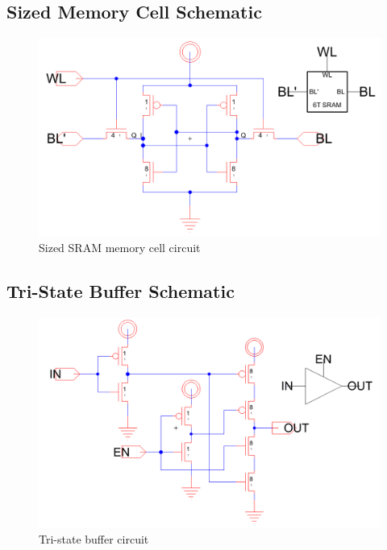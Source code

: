 \documentclass[12pt]{report}
\begin{document}
\subsection*{Sized Memory Cell Schematic}
\begin{figure}[H]
  \centering
    \includegraphics[width=1.0\textwidth]{sram_cell_circuit.PNG}
  \caption{Sized SRAM memory cell circuit}
  \label{fig:sram_cell_circuit}
\end{figure}

\subsection*{Tri-State Buffer Schematic}
\begin{figure}[H]
  \centering
    \includegraphics[width=1.0\textwidth]{tristate_buffer_circuit.PNG}
  \caption{Tri-state buffer circuit}
  \label{fig:tristate_buffer_circuit}
\end{figure}
\end{document}
